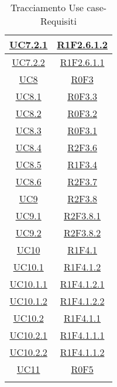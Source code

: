\begin{longtable}{|c|c|}
\hline
\hyperlink{UC7.2.1}{UC7.2.1} & \hyperlink{R1F2.6.1.2}{R1F2.6.1.2}\\
\hline
\hyperlink{UC7.2.2}{UC7.2.2} & \hyperlink{R1F2.6.1.1}{R1F2.6.1.1}\\
\hline
\hyperlink{UC8}{UC8} & \hyperlink{R0F3}{R0F3}\\
\hline
\hyperlink{UC8.1}{UC8.1} & \hyperlink{R0F3.3}{R0F3.3}\\
\hline
\hyperlink{UC8.2}{UC8.2} & \hyperlink{R0F3.2}{R0F3.2}\\
\hline
\hyperlink{UC8.3}{UC8.3} & \hyperlink{R0F3.1}{R0F3.1}\\
\hline
\hyperlink{UC8.4}{UC8.4} & \hyperlink{R2F3.6}{R2F3.6}\\
\hline
\hyperlink{UC8.5}{UC8.5} & \hyperlink{R1F3.4}{R1F3.4}\\
\hline
\hyperlink{UC8.6}{UC8.6} & \hyperlink{R2F3.7}{R2F3.7}\\
\hline
\hyperlink{UC9}{UC9} & \hyperlink{R2F3.8}{R2F3.8}\\
\hline
\hyperlink{UC9.1}{UC9.1} & \hyperlink{R2F3.8.1}{R2F3.8.1}\\
\hline
\hyperlink{UC9.2}{UC9.2} & \hyperlink{R2F3.8.2}{R2F3.8.2}\\
\hline
\hyperlink{UC10}{UC10} & \hyperlink{R1F4.1}{R1F4.1}\\
\hline
\hyperlink{UC10.1}{UC10.1} & \hyperlink{R1F4.1.2}{R1F4.1.2}\\
\hline
\hyperlink{UC10.1.1}{UC10.1.1} & \hyperlink{R1F4.1.2.1}{R1F4.1.2.1}\\
\hline
\hyperlink{UC10.1.2}{UC10.1.2} & \hyperlink{R1F4.1.2.2}{R1F4.1.2.2}\\
\hline
\hyperlink{UC10.2}{UC10.2} & \hyperlink{R1F4.1.1}{R1F4.1.1}\\
\hline
\hyperlink{UC10.2.1}{UC10.2.1} & \hyperlink{R1F4.1.1.1}{R1F4.1.1.1}\\
\hline
\hyperlink{UC10.2.2}{UC10.2.2} & \hyperlink{R1F4.1.1.2}{R1F4.1.1.2}\\
\hline
\hyperlink{UC11}{UC11} & \hyperlink{R0F5}{R0F5}\\
\hline
\caption[Tracciamento Use case-Requisiti]{Tracciamento Use case-Requisiti}
\label{tabella:requi-usecase}
\end{longtable}
\clearpage
